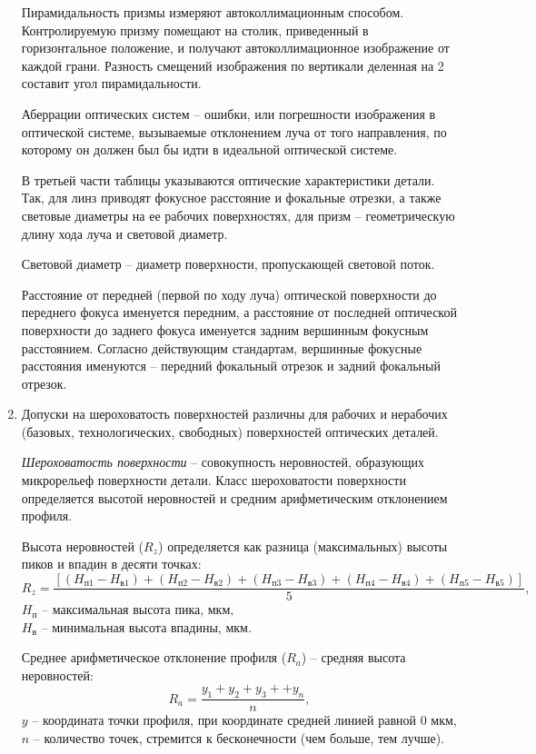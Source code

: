 \begin{enumerate}
	Пирамидальность призмы измеряют автоколлимационным способом. Контролируемую призму помещают на столик, приведенный в горизонтальное положение, и получают автоколлимационное изображение от каждой грани. Разность смещений изображения по вертикали деленная на 2 составит угол пирамидальности.
	
	Аберрации оптических систем -- ошибки, или погрешности изображения в оптической системе, вызываемые отклонением луча от того направления, по которому он должен был бы идти в идеальной оптической системе.
	
	В третьей части таблицы указываются оптические характеристики детали. Так, для линз приводят фокусное расстояние и фокальные отрезки, а также световые диаметры на ее рабочих поверхностях, для призм -- геометрическую длину хода луча и световой диаметр.
	
	Световой диаметр -- диаметр поверхности, пропускающей световой поток.
	
	Расстояние от передней (первой по ходу луча) оптической поверхности до переднего фокуса именуется передним, а расстояние от последней оптической поверхности до заднего фокуса именуется задним вершинным фокусным расстоянием. Согласно действующим стандартам, вершинные фокусные расстояния именуются -- передний фокальный отрезок и задний фокальный отрезок.
	\item Допуски на шероховатость поверхностей различны для рабочих и нерабочих (базовых, технологических, свободных) поверхностей оптических деталей.
	
	\textit{Шероховатость поверхности} -- совокупность неровностей, образующих микрорельеф поверхности детали. Класс шероховатости поверхности определяется высотой неровностей и средним арифметическим отклонением профиля.
	
	Высота неровностей ($R_z$) определяется как разница (максимальных) высоты пиков и впадин в десяти точках: 
	\begin{equation*}
	R_z = \dfrac{[(H_\text{п1}-H_\text{в1})+(H_\text{п2}-H_\text{в2})+(H_\text{п3}-H_\text{в3})+(H_\text{п4}-H_\text{в4})+(H_\text{п5}-H_\text{в5})]}{5},
	\end{equation*}
	$H_\text{п}$ -- максимальная высота пика, мкм, \\
	$H_\text{в}$ -- минимальная высота впадины, мкм.
	
	Среднее арифметическое отклонение профиля ($R_a$) -- средняя высота неровностей:
	\begin{equation*}
	R_a = \dfrac{y_1+y_2+y_3++y_n}{n},
	\end{equation*}
	$y$ -- координата точки профиля, при координате средней линией равной 0 мкм,\\
	$n$ -- количество точек, стремится к бесконечности (чем больше, тем лучше).
	

\end{enumerate}
